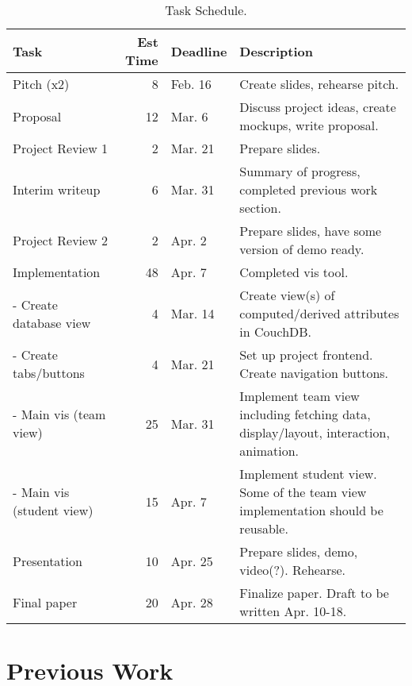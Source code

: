 \documentclass[preprint,journal]{vgtc}       %
\begin{document}
\begin{table*}[t]
  \caption{Task Schedule.}
  \label{tab:schedule}
  \centering
  \begin{tabular*}{\textwidth}{lrll}%
    \hline
    \textbf{Task} & \textbf{Est Time} & \textbf{Deadline} & \textbf{Description} \\
    \hline
    Pitch (x2)                       &  8 & Feb. 16  & Create slides, rehearse pitch. \\
    Proposal                         & 12 & Mar. 6   & Discuss project ideas, create mockups, write proposal. \\
    Project Review 1                 &  2 & Mar. 21  & Prepare slides. \\
    Interim writeup                  &  6 & Mar. 31  & Summary of progress, completed previous work section. \\
    Project Review 2                 &  2 & Apr. 2   & Prepare slides, have some version of demo ready. \\
    Implementation                   & 48 & Apr. 7   & Completed vis tool. \\
     - Create database view          &  4 & Mar. 14  & Create view(s) of computed/derived attributes in CouchDB. \\
     - Create tabs/buttons           &  4 & Mar. 21  & Set up project frontend. Create navigation buttons. \\
     - Main vis (team view)          & 25 & Mar. 31  & Implement team view including fetching data, display/layout,  interaction, animation. \\
     - Main vis (student view)       & 15 & Apr. 7   & Implement student view. Some of the team view implementation should be reusable. \\
    Presentation                     & 10 & Apr. 25  & Prepare slides, demo, video(?). Rehearse. \\
    Final paper                      & 20 & Apr. 28  & Finalize paper. Draft to be written Apr. 10-18. \\
    \hline
  \end{tabular*}
\end{table*}

\section{Previous Work}




%
%
%
%


\end{document}

